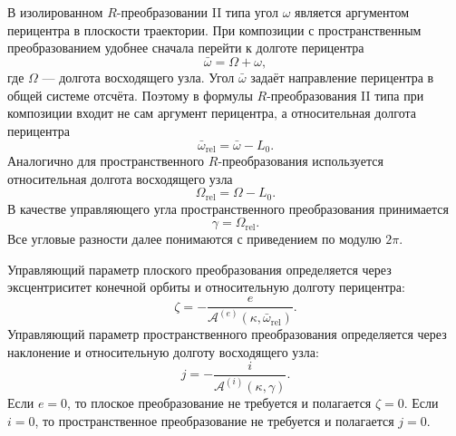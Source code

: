 В изолированном \(R\)-преобразовании II типа угол \(\omega\) является аргументом перицентра в плоскости траектории. При композиции с пространственным преобразованием удобнее сначала перейти к долготе перицентра
\begin{equation}
\bar{\omega}=\Omega+\omega,
\end{equation}
где \(\Omega\) --- долгота восходящего узла. Угол \(\bar{\omega}\) задаёт направление перицентра в общей системе отсчёта. Поэтому в формулы \(R\)-преобразования II типа при композиции входит не сам аргумент перицентра, а относительная долгота перицентра
\begin{equation}
\bar{\omega}_{\mathrm{rel}}
=
\bar{\omega}-L_0 .
\end{equation}
Аналогично для пространственного \(R\)-преобразования используется относительная долгота восходящего узла
\begin{equation}
\Omega_{\mathrm{rel}}
=
\Omega-L_0 .
\end{equation}
В качестве управляющего угла пространственного преобразования принимается
\begin{equation}
\gamma=\Omega_{\mathrm{rel}} .
\end{equation}
Все угловые разности далее понимаются с приведением по модулю \(2\pi\).

Управляющий параметр плоского преобразования определяется через эксцентриситет конечной орбиты и относительную долготу перицентра:
\begin{equation}
\zeta
=
-\frac{e}{\mathcal A^{(e)}(\kappa,\bar{\omega}_{\mathrm{rel}})}.
\end{equation}
Управляющий параметр пространственного преобразования определяется через наклонение и относительную долготу восходящего узла:
\begin{equation}
j
=
-\frac{i}{\mathcal A^{(i)}(\kappa,\gamma)}.
\end{equation}
Если \(e=0\), то плоское преобразование не требуется и полагается \(\zeta=0\). Если \(i=0\), то пространственное преобразование не требуется и полагается \(j=0\).

